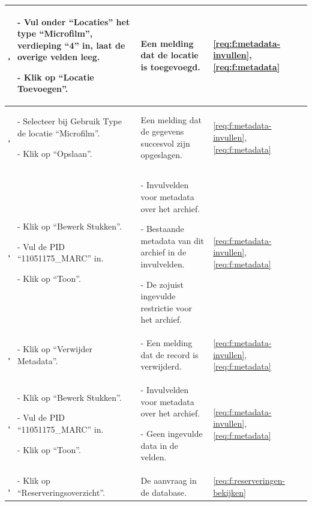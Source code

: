 \documentclass[a4paper,titlepage]{report}
\begin{document}
\begin{longtable}{| m{} | m{}
      | m{} | m{} | m{} |}
      \c &
      \par - Vul onder ``Locaties'' het type ``Microfilm'', verdieping
      ``4'' in, laat de overige velden leeg.
      \par - Klik op ``Locatie Toevoegen''.
      & Een melding dat de locatie is toegevoegd.
      & \ref{req:f:metadata-invullen}, \ref{req:f:metadata}
      & \\\hline

      \c &
      \par - Selecteer bij Gebruik Type de locatie ``Microfilm''.
      \par - Klik op ``Opslaan''.
      & Een melding dat de gegevens succesvol zijn opgeslagen.
      & \ref{req:f:metadata-invullen}, \ref{req:f:metadata}
      & \\\hline

      \c &
      \par - Klik op ``Bewerk Stukken''.
      \par - Vul de PID ``11051175\_MARC'' in.
      \par - Klik op ``Toon''.
      & \par - Invulvelden voor metadata over het archief.
        \par - Bestaande metadata van dit archief in de invulvelden.
        \par - De zojuist ingevulde restrictie voor het archief.
      & \ref{req:f:metadata-invullen}, \ref{req:f:metadata}
      & \\\hline

      \c &
      \par - Klik op ``Verwijder Metadata''.
      & \par - Een melding dat de record is verwijderd.
      & \ref{req:f:metadata-invullen}, \ref{req:f:metadata}
      & \\\hline

      \c &
      \par - Klik op ``Bewerk Stukken''.
      \par - Vul de PID ``11051175\_MARC'' in.
      \par - Klik op ``Toon''.
      & \par - Invulvelden voor metadata over het archief.
        \par - Geen ingevulde data in de velden.
      & \ref{req:f:metadata-invullen}, \ref{req:f:metadata}
      & \\\hline
      \hline

      \c &
      \par - Klik op ``Reserveringsoverzicht''.
      & \par De aanvraag in de database.
      & \ref{req:f:reserveringen-bekijken}
      & \\\hline


\end{longtable}
\end{document}
